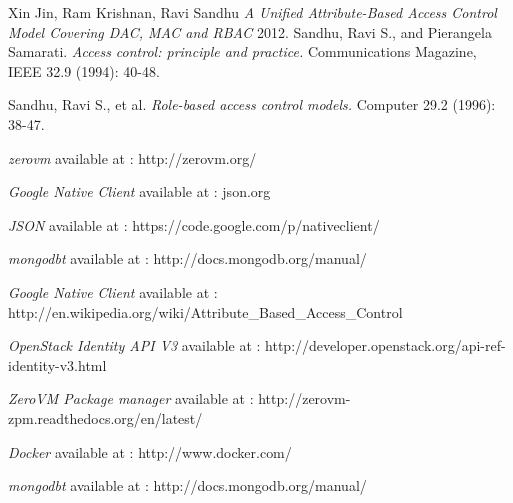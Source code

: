 \begin{thebibliography}{1}

   Xin Jin, Ram Krishnan, Ravi Sandhu  {\em A Unified Attribute-Based Access Control Model Covering DAC, MAC and RBAC}  2012.
    Sandhu, Ravi S., and Pierangela Samarati. {\em Access control: principle and practice.} Communications Magazine, IEEE 32.9 (1994): 40-48.
   
  Sandhu, Ravi S., et al. {\em Role-based access control models.} Computer 29.2 (1996): 38-47.  
   

      {\em zerovm}  available at : http://zerovm.org/   
  
      {\em Google Native Client }  available at : json.org
  
        {\em JSON }  available at : https://code.google.com/p/nativeclient/
    
     {\em mongodbt }  available at : http://docs.mongodb.org/manual/
 
      {\em Google Native Client }  available at : http://en.wikipedia.org/wiki/Attribute\_Based\_Access\_Control

    {\em OpenStack Identity API V3}  available at : http://developer.openstack.org/api-ref-identity-v3.html 
  
      {\em ZeroVM Package manager }  available at : http://zerovm-zpm.readthedocs.org/en/latest/
  
        {\em Docker }  available at : http://www.docker.com/
    
     {\em mongodbt }  available at : http://docs.mongodb.org/manual/



  \end{thebibliography}